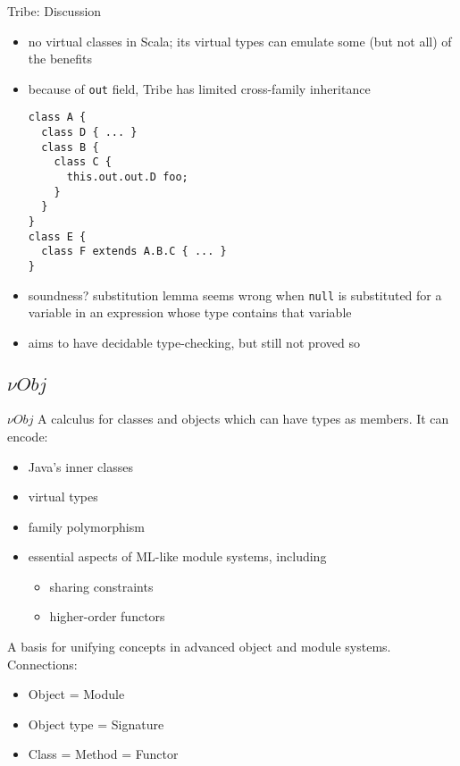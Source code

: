 \documentclass{beamer}
\begin{document}
\begin{frame}[fragile]{Tribe: Discussion}
\begin{itemize}
\item no virtual classes in Scala; its virtual types can emulate some (but not all) of the benefits
\item because of {\tt out} field, Tribe has limited cross-family inheritance %
\begin{verbatim}
class A {
  class D { ... }
  class B {
    class C {
      this.out.out.D foo;
    }
  }
}
class E {
  class F extends A.B.C { ... }
}
\end{verbatim}
\item soundness? substitution lemma seems wrong when {\tt null} is
  substituted for a variable in an expression whose type contains
  that variable %
\item aims to have decidable type-checking, but still not proved so
\end{itemize}
\end{frame}


\subsection{${\nu}Obj$}

\begin{frame}{${\nu}Obj$}
A calculus for classes and objects which can have types as members. It can encode:
\begin{itemize}
\item Java's inner classes
\item virtual types
\item family polymorphism
\item essential aspects of ML-like module systems, including
\begin{itemize}
\item sharing constraints
\item higher-order functors
\end{itemize}
\end{itemize}
A basis for unifying concepts  in advanced object and module systems. Connections:
\begin{itemize}
\item Object = Module
\item Object type = Signature
\item Class = Method = Functor
\end{itemize}
\end{frame}
\end{document}
